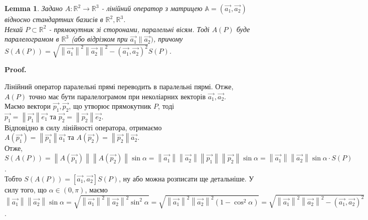 \documentclass[a4paper, 10pt]{article}
\makeatletter
\def\qed{$\blacksquare$}
\theoremstyle{theoremdd}
\theoremstyle{theoremdd}
\theoremstyle{theoremdd}
\theoremstyle{theoremdd}
\theoremstyle{theoremdd}
\theoremstyle{theoremdd}
\theoremstyle{theoremdd}
\theoremstyle{theoremdd}
\theoremstyle{theoremdd}
\theoremstyle{theoremdd}
\theoremstyle{theoremdd}
\theoremstyle{theoremdd}
\theoremstyle{theoremdd}
\newtheorem{lemma}[theorem]{Lemma}
\theoremstyle{theoremdd}
\theoremstyle{theoremdd}
\renewenvironment{proof}[1][Proof.\\]{\par
\pushQED{\hfill \qed}%
\normalfont \topsep6\p@\@plus6\p@\relax
\trivlist
\item\relax
{\bfseries
#1\@addpunct{.}}\hspace\labelsep\ignorespaces
}{%
\popQED\endtrivlist\@endpefalse
}
\newcommand\Norm[1]{\left\lVert#1\right\rVert}
\makeatother
\begin{document}
\begin{lemma}
Задано $A: \mathbb{R}^2 \to \mathbb{R}^3$ - лінійний оператор з матрицею $\mathbb{A} = ( \vec{a_1}, \vec{a_2} )$ відносно стандартних базисів в $\mathbb{R}^2, \mathbb{R}^3$.\\
Нехай $P \subset \mathbb{R}^2$ - прямокутник зі сторонами, паралельні вісям. Тоді $A(P)$ буде паралелограмом в $\mathbb{R}^3$ (або відрізком при $\vec{a_1} \parallel \vec{a_2})$, причому\\
$S(A(P)) = \sqrt{\Norm{\vec{a_1}}^2 \Norm{\vec{a_2}}^2 - (\vec{a_1},\vec{a_2})^2} S(P)$.
\begin{figure}[H]
\centering
{}
\qquad
{}
\end{figure}
\end{lemma}

\begin{proof}
Лінійний оператор паралельні прямі переводить в паралельні пярмі. Отже, $A(P)$ точно має бути паралелограмом при неколіарних векторів $\vec{a_1},\vec{a_2}$.\\
Маємо вектори $\vec{p_1},\vec{p_2}$, що утворює прямокутник $P$, тоді\\
$\vec{p_1} = \Norm{\vec{p_1}} \vec{e_1}$ та $\vec{p_2} = \Norm{\vec{p_2}} \vec{e_2}$.\\
Відповідно в силу лінійності оператора, отримаємо\\
$A(\vec{p_1}) = \Norm{\vec{p_1}} \vec{a_1}$ та $A(\vec{p_2}) = \Norm{\vec{p_2}} \vec{a_2}$.\\
Отже, $S(A(P)) = \Norm{A(\vec{p_1})} \Norm{A(\vec{p_2})} \sin \alpha = \Norm{\vec{a_1}} \Norm{\vec{a_2}} \Norm{\vec{p_1}} \Norm{\vec{p_2}} \sin \alpha = \Norm{\vec{a_1}} \Norm{\vec{a_2}} \sin \alpha\cdot S(P)$.\\
Тобто $S(A(P)) = [\vec{a_1},\vec{a_2}] S(P)$, ну або можна розписати ще детальніше. У силу того, що $\alpha \in (0,\pi)$, маємо\\
$\Norm{\vec{a_1}} \Norm{\vec{a_2}} \sin \alpha = \sqrt{\Norm{\vec{a_1}}^2 \Norm{\vec{a_2}}^2 \sin^2 \alpha} = \sqrt{\Norm{\vec{a_1}}^2 \Norm{\vec{a_2}}^2 (1-\cos^2 \alpha)} = \sqrt{\Norm{\vec{a_1}}^2 \Norm{\vec{a_2}}^2 - (\vec{a_1},\vec{a_2})^2}$.
\end{proof}
\end{document}
